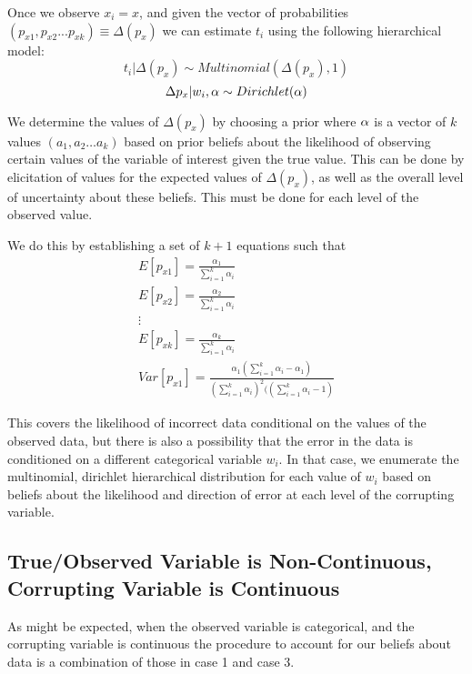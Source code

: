 \documentclass[fignum,letterpaper,12pt]{article}
\begin{document}
Once we observe $x_{i}=x$, and given the vector of probabilities $(p_{x1}, p_{x2}...p_{xk}) \equiv \Delta (p_{x})$ we can estimate $t_{i}$ using the following hierarchical model:
\begin{equation}
t_{i}| \Delta (p_{x}) \sim Multinomial (\Delta (p_{x}),1)
\end{equation}
\begin{equation}
\Delta p_{x}|w_{i},\alpha \sim Dirichlet(\bf{\alpha})
\end{equation}

We determine the values of $\Delta (p_{x})$ by choosing a prior where $\bf{\alpha}$ is a vector of $k$ values $(a_{1}, a_{2} \hdots a_{k})$ based on prior beliefs about the likelihood of observing certain values of the variable of interest given the true value. This can be done by elicitation of values for the expected values of $\Delta (p_{x})$, as well as the overall level of uncertainty about these beliefs. This must be done for each level of the observed value.

We do this by establishing a set of $k+1$ equations such that
\begin{equation}
\begin{array}{rl}
E[p_{x1}] = \frac{\alpha_{1}}{\sum_{i=1}^{k} \alpha_{i}} \\
E[p_{x2}] = \frac{\alpha_{2}}{\sum_{i=1}^{k} \alpha_{i}} \\
\vdots \\
E[p_{xk}] = \frac{\alpha_{k}}{\sum_{i=1}^{k} \alpha_{i}} \\
Var[p_{x1}] = \frac{\alpha_{1}(\sum_{i=1}^{k} \alpha_{i}-\alpha_{1})}{(\sum_{i=1}^{k} \alpha_{i})^{2}((\sum_{i=1}^{k} \alpha_{i}-1)} 
\end{array}
\end{equation}

This covers the likelihood of incorrect data conditional on the values of the observed data, but there is also a possibility that the error in the data is conditioned on a different categorical variable $w_i$. In that case, we enumerate the multinomial, dirichlet hierarchical distribution for each value of $w_i$ based on beliefs about the likelihood and direction of error at each level of the corrupting variable.



\subsection{True/Observed Variable is Non-Continuous, Corrupting Variable is Continuous} \label{subsec:case3}
As might be expected, when the observed variable is categorical, and the corrupting variable is continuous the procedure to account for our beliefs about data is a combination of those in case 1 and case 3.
\end{document}
